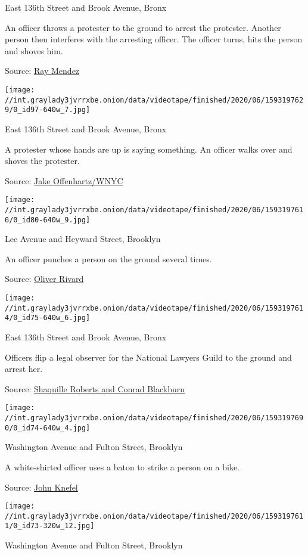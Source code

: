  East 136th Street and Brook Avenue, Bronx

 An officer throws a protester to the ground to arrest the protester.
Another person then interferes with the arresting officer. The officer
turns, hits the person and shoves him.

Source: \href{https://www.youtube.com/watch?v=eXceGpFwVEE}{Ray Mendez}

\texttt{[image: //int.graylady3jvrrxbe.onion/data/videotape/finished/2020/06/1593197629/0\_id97-640w\_7.jpg]}

 East 136th Street and Brook Avenue, Bronx

 A protester whose hands are up is saying something. An officer walks
over and shoves the protester.

Source:
\href{https://twitter.com/jangelooff/status/1268698274371944451}{Jake
Offenhartz/WNYC}

\texttt{[image: //int.graylady3jvrrxbe.onion/data/videotape/finished/2020/06/1593197616/0\_id80-640w\_9.jpg]}

 Lee Avenue and Heyward Street, Brooklyn

 An officer punches a person on the ground several times.

Source:
\href{https://twitter.com/OLIVERIVARD/status/1268763639772839936}{Oliver
Rivard}

\texttt{[image: //int.graylady3jvrrxbe.onion/data/videotape/finished/2020/06/1593197614/0\_id75-640w\_6.jpg]}

 East 136th Street and Brook Avenue, Bronx

 Officers flip a legal observer for the National Lawyers Guild to the
ground and arrest her.

Source:
\href{https://twitter.com/jangelooff/status/1270105416689750016}{Shaquille
Roberts and Conrad Blackburn}

\texttt{[image: //int.graylady3jvrrxbe.onion/data/videotape/finished/2020/06/1593197690/0\_id74-640w\_4.jpg]}

 Washington Avenue and Fulton Street, Brooklyn

 A white-shirted officer uses a baton to strike a person on a bike.

Source:
\href{https://twitter.com/johnknefel/status/1268736946031001607}{John
Knefel}

\texttt{[image: //int.graylady3jvrrxbe.onion/data/videotape/finished/2020/06/1593197611/0\_id73-320w\_12.jpg]}

 Washington Avenue and Fulton Street, Brooklyn

